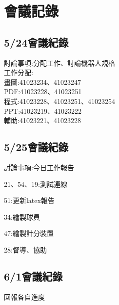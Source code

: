 \chapter{會議記錄}


\section{5/24會議紀錄}


討論事項:分配工作、討論機器人規格\\


工作分配:\\
畫圖:41023234、41023247\\
PDF:41023228、41023251\\
程式:41023228、41023251、41023254\\
PPT:41023219、41023222\\
輔助:41023221、41023228\\


\section{5/25會議紀錄}

討論事項:今日工作報告

21、54、19:測試連線

51:更新latex報告

34:繪製球員

47:繪製計分裝置

28:督導、協助

\section{6/1會議紀錄}
回報各自進度


	